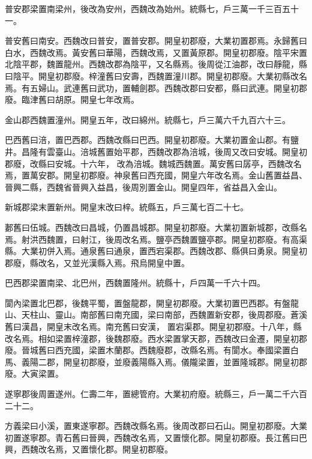 \begin{pinyinscope}
 普安郡梁置南梁州，後改為安州，西魏改為始州。統縣七，戶三萬一千三百五十一。



 普安舊曰南安。西魏改曰普安，置普安郡。開皇初郡廢，大業初置郡焉。永歸舊曰白水，西魏改焉。黃安舊曰華陽，西魏改焉，又置黃原郡。開皇初郡廢。陰平宋置北陰平郡，魏置龍州。西魏改郡為陰平，又名縣焉。後周從江油郡，改曰靜龍，縣曰陰平。開皇初郡廢。梓潼舊曰安壽，西魏置潼川郡。開皇初郡廢。大業初縣改名焉。有五婦山。武連舊曰武功，置輔劍郡。西魏改郡曰安都，縣曰武連。開皇初郡廢。臨津舊曰胡原。開皇七年改焉。



 金山郡西魏置潼州。開皇五年，改曰綿州。統縣七，戶三萬六千九百六十三。



 巴西舊曰涪，置巴西郡。西魏改縣曰巴西。開皇初郡廢。大業初置金山郡。有鹽井。昌隆有雲臺山。涪城舊置始平郡，西魏改郡為涪城，後周又改曰安城。開皇初郡廢，改縣曰安城。十六年，
 改為涪城。魏城西魏置。萬安舊曰孱亭，西魏改名焉，置萬安郡。開皇初郡廢。神泉舊曰西充國，開皇六年改名焉。金山舊置益昌、晉興二縣，西魏省晉興入益昌，後周別置金山。開皇四年，省益昌入金山。



 新城郡梁末置新州。開皇末改曰梓。統縣五，戶三萬七百二十七。



 郪舊曰伍城。西魏改曰昌城，仍置昌城郡。開皇初郡廢。大業初置新城郡，改縣名焉。射洪西魏置，曰射江，後周改名焉。鹽亭西魏置鹽亭郡。開皇初郡廢。有高渠縣。大業初併入焉。通泉舊曰通泉，置西宕渠郡。西魏改郡、縣俱曰勇泉。開皇初郡廢，縣改名，又並光漢縣入焉。飛烏開皇中置。



 巴西郡梁置南梁、北巴州，西魏置隆州。統縣十，戶四萬一千六十四。



 閬內梁置北巴郡，後魏平蜀，置盤龍郡，開皇初郡廢。大業初置巴西郡。有盤龍山、天柱山、靈山。南部舊曰南充國，梁曰南部，西魏置新安郡，後周郡廢。蒼溪舊曰漢昌，開皇末改名焉。南充舊曰安漢，
 置宕渠郡。開皇初郡廢。十八年，縣改名焉。相如梁置梓潼郡，後魏郡廢。西水梁置掌天郡，西魏改曰金遷，開皇初郡廢。晉城舊曰西充國，梁置木蘭郡。西魏廢郡，改縣名焉。有閬水。奉國梁置白馬、義陽二郡，開皇初郡廢，並廢義陽縣入焉。儀隴梁置，並置隆城郡。開皇初郡廢。大寅梁置。



 遂寧郡後周置遂州。仁壽二年，置總管府。大業初府廢。統縣三，戶一萬二千六百二十二。



 方義梁曰小溪，置東遂寧郡。西魏改縣名焉。後周改郡曰石山。開皇初郡廢。大業初置遂寧郡。青石舊曰晉興，西魏改名焉，又置懷化郡。開皇初郡廢。長江舊曰巴興，西魏改名焉，又置懷化郡。開皇初郡廢。




\end{pinyinscope}
